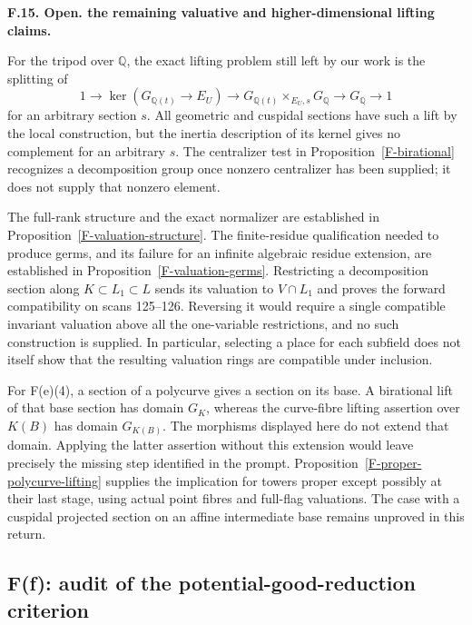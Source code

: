 \documentclass[11pt,oneside]{article}
\makeatletter
\newcounter{statementanchor}
\newenvironment{statement}[3]{%
 \refstepcounter{statementanchor}\def\@currentlabel{#1}%
 \par\addvspace{9pt}\noindent
 \textbf{#1. #2. #3.}\par\nobreak\noindent\ignorespaces
}{\par\addvspace{5pt}}
\makeatother
\begin{document}
\begin{statement}{F.15}{Open}{the remaining valuative and higher-dimensional lifting claims}
\label{st:F.15}
\label{F-open-valuations}
For the tripod over $\mathbb Q$, the exact lifting problem still
left by our work is the splitting of
\[
 1\longrightarrow\ker(G_{\mathbb Q(t)}\to E_U)
 \longrightarrow G_{\mathbb Q(t)}\times_{E_U,s}G_{\mathbb Q}
 \longrightarrow G_{\mathbb Q}\longrightarrow1
\]
for an arbitrary section $s$. All geometric and cuspidal sections
have such a lift by the local construction, but the inertia
description of its kernel gives no complement for an arbitrary
$s$. The centralizer test in Proposition~\ref{F-birational}
recognizes a decomposition group once nonzero centralizer has
been supplied; it does not supply that nonzero element.

The full-rank structure and the exact normalizer are established
in Proposition~\ref{F-valuation-structure}. The finite-residue
qualification needed to produce germs, and its failure for an
infinite algebraic residue extension, are established in
Proposition~\ref{F-valuation-germs}. Restricting a decomposition
section along $K\subset L_1\subset L$ sends its valuation to
$V\cap L_1$ and proves the forward compatibility on scans
125--126. Reversing it would require a single compatible invariant
valuation above all the one-variable restrictions, and no such
construction is supplied. In particular, selecting a place for
each subfield does not itself show that the resulting valuation
rings are compatible under inclusion.

For F(e)(4), a section of a polycurve gives a section on its base.
A birational lift of that base section has domain $G_K$, whereas
the curve-fibre lifting assertion over $K(B)$ has domain
$G_{K(B)}$. The morphisms displayed here do not extend that
domain. Applying the latter assertion without this extension
would leave precisely the missing step identified in the prompt.
Proposition~\ref{F-proper-polycurve-lifting} supplies the
implication for towers proper except possibly at their last stage,
using actual point fibres and full-flag valuations. The case with
a cuspidal projected section on an affine intermediate base remains
unproved in this return.
\end{statement}

\subsection{F(f): audit of the potential-good-reduction criterion}
\end{document}
